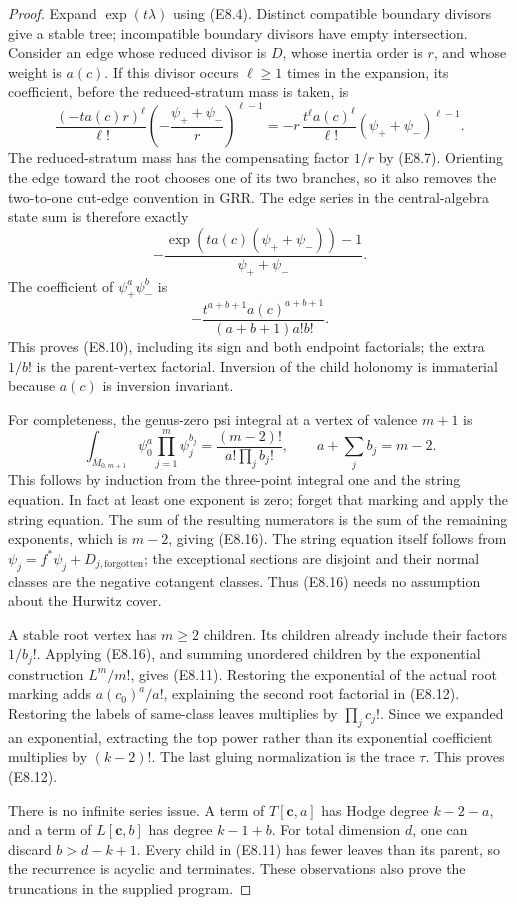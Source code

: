 \begin{proof}
Expand $\exp(t\lambda)$ using (E8.4).  Distinct compatible boundary
divisors give a stable tree; incompatible boundary divisors have
empty intersection.  Consider an edge whose reduced divisor is
$D$, whose inertia order is $r$, and whose weight is $a(c)$.
If this divisor occurs $\ell\ge1$ times in the expansion, its
coefficient, before the reduced-stratum mass is taken, is
\[
 \frac{(-t a(c)r)^\ell}{\ell!}
       \left(-\frac{\psi_++\psi_-}{r}\right)^{\ell-1}
 =-r\,\frac{t^\ell a(c)^\ell}{\ell!}
                 (\psi_++\psi_-)^{\ell-1}.                   \tag{E8.13}
\]
The reduced-stratum mass has the compensating factor $1/r$ by
(E8.7).  Orienting the edge toward the root chooses one of its
two branches, so it also removes the two-to-one cut-edge convention
in GRR.  The edge series in the central-algebra state sum is
therefore exactly
\[
       -\frac{\exp(t a(c)(\psi_++\psi_-))-1}
                   {\psi_++\psi_-}.                         \tag{E8.14}
\]
The coefficient of $\psi_+^a\psi_-^b$ is
\[
       -\frac{t^{a+b+1}a(c)^{a+b+1}}{(a+b+1)a!b!}.           \tag{E8.15}
\]
This proves (E8.10), including its sign and both endpoint
factorials; the extra $1/b!$ is the parent-vertex factorial.
Inversion of the child holonomy is immaterial because $a(c)$ is
inversion invariant.

For completeness, the genus-zero psi integral at a vertex of
valence $m+1$ is
\[
 \int_{\overline M_{0,m+1}}\psi_0^a\prod_{j=1}^m\psi_j^{b_j}
   =\frac{(m-2)!}{a!\prod_jb_j!},\qquad
                  a+\sum_jb_j=m-2.                           \tag{E8.16}
\]
This follows by induction from the three-point integral one and
the string equation.  In fact at least one exponent is zero;
forget that marking and apply the string equation.  The sum of
the resulting numerators is the sum of the remaining exponents,
which is $m-2$, giving (E8.16).  The string equation itself follows
from $\psi_j=f^*\psi_j+D_{j,\mathrm{forgotten}}$; the exceptional
sections are disjoint and their normal classes are the negative
cotangent classes.  Thus (E8.16) needs no assumption about the
Hurwitz cover.

A stable root vertex has $m\ge2$ children.  Its children already
include their factors $1/b_j!$.  Applying (E8.16), and summing
unordered children by the exponential construction $L^m/m!$,
gives (E8.11).  Restoring the exponential of the actual root
marking adds $a(c_0)^a/a!$, explaining the second root factorial
in (E8.12).  Restoring the labels of same-class leaves multiplies
by $\prod_jc_j!$.  Since we expanded an exponential, extracting
the top power rather than its exponential coefficient multiplies
by $(k-2)!$.  The last gluing normalization is the trace $\tau$.
This proves (E8.12).

There is no infinite series issue.  A term of $T[\mathbf c,a]$
has Hodge degree $k-2-a$, and a term of $L[\mathbf c,b]$ has
degree $k-1+b$.  For total dimension $d$, one can discard
$b>d-k+1$.  Every child in (E8.11) has fewer leaves than its
parent, so the recurrence is acyclic and terminates.  These
observations also prove the truncations in the supplied program.
\end{proof}


